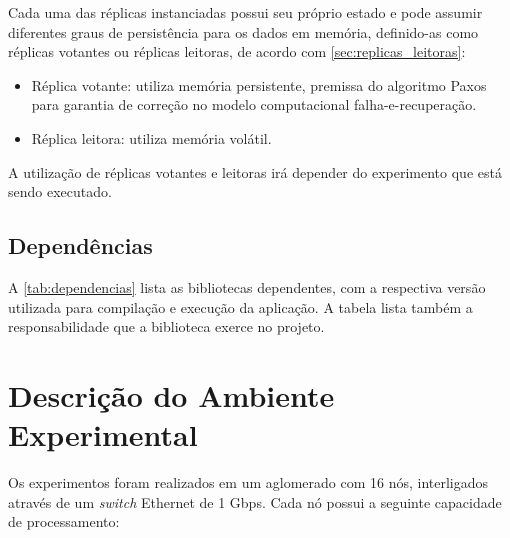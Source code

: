 Cada uma das réplicas instanciadas possui seu próprio estado e pode assumir diferentes
graus de persistência para os dados em memória, definido-as como réplicas votantes ou
réplicas leitoras, de acordo com \autoref{sec:replicas_leitoras}:

\begin{itemize}
  \item Réplica votante: utiliza memória persistente, premissa do algoritmo Paxos para
    garantia de correção no modelo computacional falha-e-recuperação.
  \item Réplica leitora: utiliza memória volátil.
\end{itemize}

A utilização de réplicas votantes e leitoras irá depender do experimento que está sendo
executado.

\subsection{Dependências}

A \autoref{tab:dependencias} lista as bibliotecas dependentes, com a respectiva versão
utilizada para compilação e execução da aplicação. A tabela lista também a
responsabilidade que a biblioteca exerce no projeto.

\begin{table}[htb]
\end{table}

\section{Descrição do Ambiente Experimental}\label{sec:ambiente_experimental}

Os experimentos foram realizados em um aglomerado com 16 nós, interligados através de um
\emph{switch} Ethernet de 1 Gbps. Cada nó possui a seguinte capacidade de processamento:

